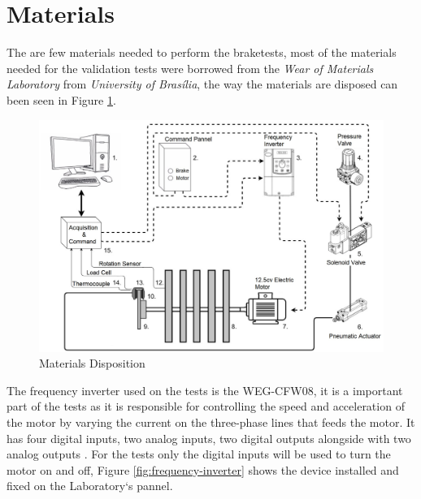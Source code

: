 \section{Materials}\label{sec:materials}
		The are few materials needed to perform the braketests, most of the materials needed for the validation tests were borrowed from the \textit{Wear of Materials Laboratory} from \textit{University of Brasília}, the way the materials are disposed can been seen in Figure \ref{fig:materials-scheme}.

		\begin{figure}[htbp]
			\centering
			\includegraphics[width=1\textwidth]{figuras/fig-materials-scheme}
			\caption{Materials Disposition}
			\label{fig:materials-scheme}
		\end{figure}

		\par
		The frequency inverter used on the tests is the WEG-CFW08, it is a important part of the tests as it is responsible for controlling the speed and acceleration of the motor by varying the current on the three-phase lines that feeds the motor. It has four digital inputs, two analog inputs, two digital outputs alongside with two analog outputs \cite{wegCFW08Manual}. For the tests only the digital inputs will be used to turn the motor on and off, Figure \ref{fig:frequency-inverter} shows the device installed and fixed on the Laboratory`s pannel.

